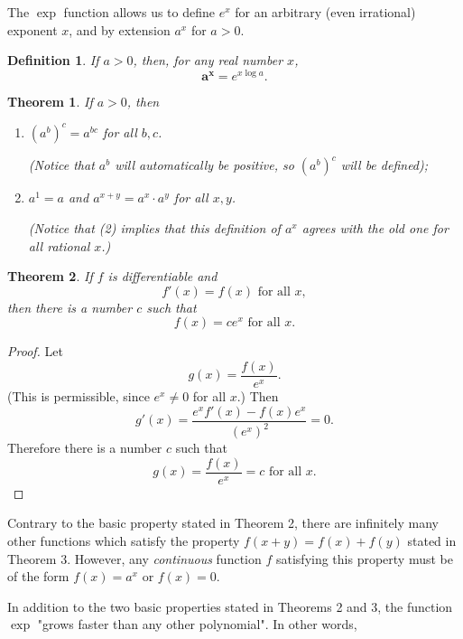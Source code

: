 \documentclass{article}
\newtheorem{definition}{Definition}
\newtheorem{theorem}{Theorem}
\begin{document}
The $\exp$ function allows us to define $e^x$ for an arbitrary (even
irrational) exponent $x$, and by extension $a^x$ for $a > 0$.

\begin{definition}
  If $a > 0$, then, for any real number $x$, \[ \pmb{a^x} = e^{x\log a}. \]
\end{definition}

\begin{theorem}
  If $a > 0$, then
  \begin{enumerate}
    \item $(a^b)^c = a^{bc}$ for all $b, c$.

      (Notice that $a^b$ will automatically be positive, so $(a^b)^c$ will be
      defined);
    \item $a^1 = a$ and $a^{x + y} = a^x \cdot a^y$ for all $x, y$.

      (Notice that (2) implies that this definition of $a^x$ agrees with the
      old one for all rational $x$.)
  \end{enumerate}
\end{theorem}

\begin{theorem}
  If $f$ is differentiable and \[ f'(x) = f(x) \text{ for all } x, \] then
  there is a number $c$ such that \[ f(x) = ce^x \text{ for all } x. \]
\end{theorem}
\begin{proof}
  Let \[ g(x) = \frac{f(x)}{e^x}. \] (This is permissible, since $e^x \neq 0$
  for all $x$.) Then \[
    g'(x) = \frac{e^xf'(x) - f(x)e^x}{(e^x)^2} = 0.
  \] Therefore there is a number $c$ such that \[
    g(x) = \frac{f(x)}{e^x} = c \text{ for all } x.
  \]
\end{proof}

Contrary to the basic property stated in Theorem 2, there are infinitely many
other functions which satisfy the property $f(x + y) = f(x) + f(y)$ stated in
Theorem 3. However, any \emph{continuous} function $f$ satisfying this property
must be of the form $f(x) = a^x$ or $f(x) = 0$.

In addition to the two basic properties stated in Theorems 2 and 3, the
function $\exp$ "grows faster than any other polynomial". In other words,
\end{document}
